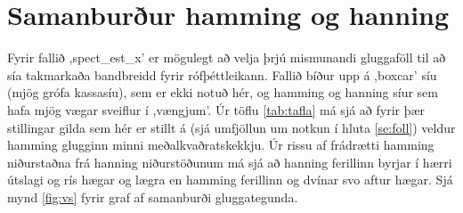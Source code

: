 \documentclass[11pt,a4paper]{article}
\begin{document}
\section{Samanburður hamming og hanning}
Fyrir fallið ,spect\_est\_x' er mögulegt að velja þrjú mismunandi gluggaföll til að sía takmarkaða bandbreidd fyrir
rófþéttleikann. Fallið bíður upp á ,boxcar' síu (mjög grófa kassasíu), sem er ekki notuð hér, og hamming og hanning
síur sem hafa mjög vægar sveiflur í ,vængjum'. Úr töflu \ref{tab:tafla} má sjá að fyrir þær stillingar gilda sem hér
er stillt á (sjá umfjöllun um notkun í hluta \ref{se:foll}) veldur hamming glugginn
minni meðalkvaðratskekkju. Úr rissu af frádrætti hamming niðurstaðna frá hanning niðurstöðunum má sjá að hanning
ferillinn byrjar í hærri útslagi og rís hægar og lægra en hamming ferillinn og dvínar svo aftur hægar. Sjá mynd 
\ref{fig:vs} fyrir graf af samanburði gluggategunda.
\clearpage
\end{document}
